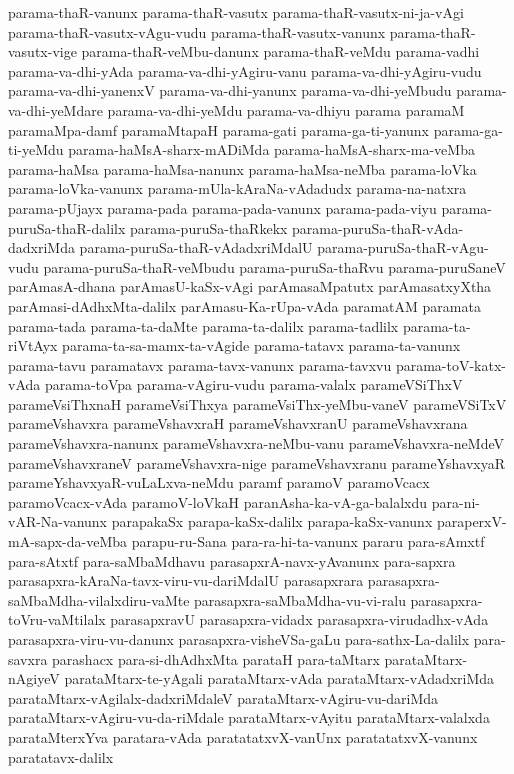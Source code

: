 {parama-thaR-vanunx
parama-thaR-vasutx
parama-thaR-vasutx-ni-ja-vAgi
parama-thaR-vasutx-vAgu-vudu
parama-thaR-vasutx-vanunx
parama-thaR-vasutx-vige
parama-thaR-veMbu-danunx
parama-thaR-veMdu
parama-vadhi
parama-va-dhi-yAda
parama-va-dhi-yAgiru-vanu
parama-va-dhi-yAgiru-vudu
parama-va-dhi-yanenxV
parama-va-dhi-yanunx
parama-va-dhi-yeMbudu
parama-va-dhi-yeMdare
parama-va-dhi-yeMdu
parama-va-dhiyu
parama
paramaM
paramaMpa-damf
paramaMtapaH
parama-gati
parama-ga-ti-yanunx
parama-ga-ti-yeMdu
parama-haMsA-sharx-mADiMda
parama-haMsA-sharx-ma-veMba
parama-haMsa
parama-haMsa-nanunx
parama-haMsa-neMba
parama-loVka
parama-loVka-vanunx
parama-mUla-kAraNa-vAdadudx
parama-na-natxra
parama-pUjayx
parama-pada
parama-pada-vanunx
parama-pada-viyu
parama-puruSa-thaR-dalilx
parama-puruSa-thaRkekx
parama-puruSa-thaR-vAda-dadxriMda
parama-puruSa-thaR-vAdadxriMdalU
parama-puruSa-thaR-vAgu-vudu
parama-puruSa-thaR-veMbudu
parama-puruSa-thaRvu
parama-puruSaneV
parAmasA-dhana
parAmasU-kaSx-vAgi
parAmasaMpatutx
parAmasatxyXtha
parAmasi-dAdhxMta-dalilx
parAmasu-Ka-rUpa-vAda
paramatAM
paramata
parama-tada
parama-ta-daMte
parama-ta-dalilx
parama-tadlilx
parama-ta-riVtAyx
parama-ta-sa-mamx-ta-vAgide
parama-tatavx
parama-ta-vanunx
parama-tavu
paramatavx
parama-tavx-vanunx
parama-tavxvu
parama-toV-katx-vAda
parama-toVpa
parama-vAgiru-vudu
parama-valalx
parameVSiThxV
parameVsiThxnaH
parameVsiThxya
parameVsiThx-yeMbu-vaneV
parameVSiTxV
parameVshavxra
parameVshavxraH
parameVshavxranU
parameVshavxrana
parameVshavxra-nanunx
parameVshavxra-neMbu-vanu
parameVshavxra-neMdeV
parameVshavxraneV
parameVshavxra-nige
parameVshavxranu
parameYshavxyaR
parameYshavxyaR-vuLaLxva-neMdu
paramf
paramoV
paramoVcacx
paramoVcacx-vAda
paramoV-loVkaH
paranAsha-ka-vA-ga-balalxdu
para-ni-vAR-Na-vanunx
parapakaSx
parapa-kaSx-dalilx
parapa-kaSx-vanunx
paraperxV-mA-sapx-da-veMba
parapu-ru-Sana
para-ra-hi-ta-vanunx
pararu
para-sAmxtf
para-sAtxtf
para-saMbaMdhavu
parasapxrA-navx-yAvanunx
para-sapxra
parasapxra-kAraNa-tavx-viru-vu-dariMdalU
parasapxrara
parasapxra-saMbaMdha-vilalxdiru-vaMte
parasapxra-saMbaMdha-vu-vi-ralu
parasapxra-toVru-vaMtilalx
parasapxravU
parasapxra-vidadx
parasapxra-virudadhx-vAda
parasapxra-viru-vu-danunx
parasapxra-visheVSa-gaLu
para-sathx-La-dalilx
para-savxra
parashacx
para-si-dhAdhxMta
parataH
para-taMtarx
parataMtarx-nAgiyeV
parataMtarx-te-yAgali
parataMtarx-vAda
parataMtarx-vAdadxriMda
parataMtarx-vAgilalx-dadxriMdaleV
parataMtarx-vAgiru-vu-dariMda
parataMtarx-vAgiru-vu-da-riMdale
parataMtarx-vAyitu
parataMtarx-valalxda
parataMterxYva
paratara-vAda
paratatatxvX-vanUnx
paratatatxvX-vanunx
paratatavx-dalilx
}

